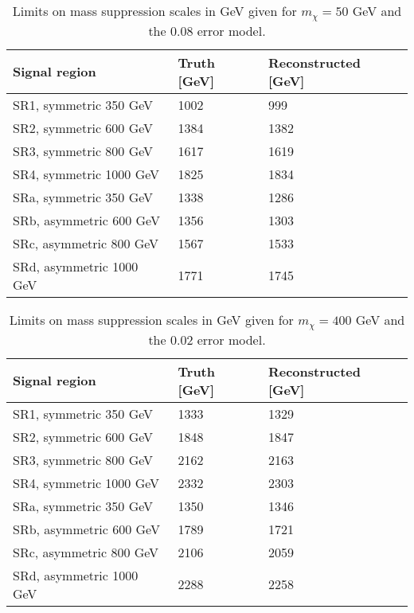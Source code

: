 \begin{table}[ht]
\begin{center}
\begin{tabular}{|l|l|l|}
\hline
Signal region & Truth [GeV]& Reconstructed [GeV]\\ \hline
SR1, symmetric 350 GeV&1002&999\\
SR2, symmetric 600 GeV&1384&1382\\
SR3, symmetric 800 GeV&1617&1619\\
SR4, symmetric 1000 GeV&1825&1834\\ \hline
SRa, symmetric 350 GeV&1338&1286\\
SRb, asymmetric 600 GeV&1356&1303\\
SRc, asymmetric 800 GeV&1567&1533\\
SRd, asymmetric 1000 GeV&1771&1745\\ \hline
\end{tabular}
\caption{Limits on mass suppression scales in GeV given for $m_{\chi}=50$ GeV and the 0.08 error model.}
\label{tab:masssupp010}
\end{center}
\end{table}

\begin{table}[ht!]
\begin{center}
\begin{tabular}{|l|l|l|}
\hline
Signal region & Truth [GeV]& Reconstructed [GeV]\\ \hline
SR1, symmetric 350 GeV &1333&1329\\
SR2, symmetric 600 GeV&1848&1847\\
SR3, symmetric 800 GeV&2162&2163\\
SR4, symmetric 1000 GeV&2332&2303\\ \hline
SRa, symmetric 350 GeV&1350&1346\\
SRb, asymmetric 600 GeV&1789&1721\\
SRc, asymmetric 800 GeV&2106&2059\\
SRd, asymmetric 1000 GeV&2288&2258\\ \hline
\end{tabular}
\caption{Limits on mass suppression scales in GeV given for $m_{\chi}=400$ GeV and the 0.02 error model.}
\label{tab:masssupp2002}
\end{center}
\end{table}


